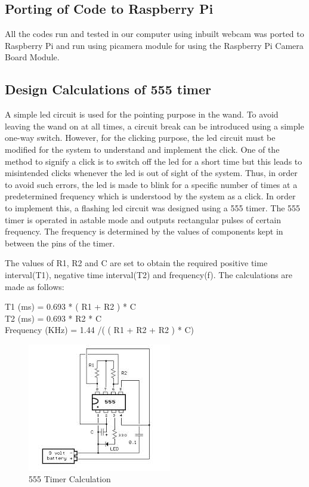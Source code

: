 \documentclass[12pt, a4paper]{article}
\begin{document}
\subsection{Porting of Code to Raspberry Pi}
	All the codes run and tested in our computer using inbuilt webcam was ported to Raspberry Pi and run using picamera module for using the Raspberry Pi Camera Board Module.

\subsection{Design Calculations of 555 timer}
	A simple led circuit is used for the pointing purpose in the wand. To avoid leaving the wand on at all times, a circuit break can be introduced using a simple one-way switch. However, for the clicking purpose, the led circuit must be modified for the system to understand and implement the click. 
	One of the method to signify a click is to switch off the led for a short time but this leads to misintended clicks whenever the led is out of sight of the system. Thus, in order to avoid such errors, the led is made to blink for a specific number of times at a predetermined frequency which is understood by the system as a click. In order to implement this, a flashing led circuit was designed using a 555 timer. 
	The 555 timer is operated in astable mode and outputs rectangular pulses of certain frequency. The frequency is determined by the values of components kept in between the pins of the timer.


	The values of R1, R2 and C are set to obtain the required positive time interval(T1), negative time interval(T2) and frequency(f). The calculations are made as follows:

	\noindent
	T1 (ms) = 0.693 * ( R1 + R2 ) * C \\
	T2 (ms)  = 0.693 * R2 * C \\
	Frequency (KHz)  = 1.44 /( ( R1 + R2 + R2 ) * C)

\begin{figure}[htp]
	\centering
	\includegraphics[scale=0.67]{blinking.jpg}
	\caption{555 Timer Calculation}
	\label{}
\end{figure}
\end{document}
